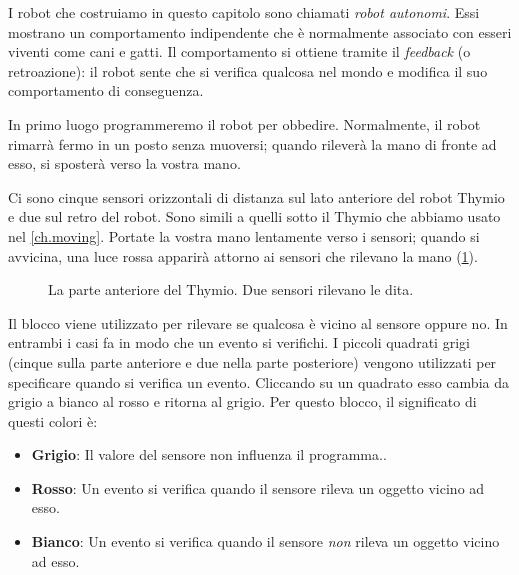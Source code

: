 
\label{ch.pet}

I robot che costruiamo in questo capitolo sono chiamati \emph{robot autonomi}.
Essi mostrano un comportamento indipendente che è normalmente associato con
esseri viventi come cani e gatti. Il comportamento si ottiene tramite il
\textit{feedback} (o retroazione): il robot sente che si verifica qualcosa nel
mondo e modifica il suo comportamento di conseguenza.


In primo luogo programmeremo il robot per obbedire. Normalmente, il robot rimarrà fermo in
un posto senza muoversi; quando rileverà la mano di fronte ad esso,
si sposterà verso la vostra mano.

Ci sono cinque sensori orizzontali di distanza sul lato anteriore del robot Thymio
e due sul retro del robot.
Sono simili a quelli sotto il Thymio che abbiamo usato nel \cref{ch.moving}.
Portate la vostra mano lentamente verso i
sensori; quando si avvicina, una luce rossa apparirà attorno ai sensori
che rilevano la mano (\cref{fig.detect}).

\begin{figure}
\begin{center}
\caption{La parte anteriore del Thymio. Due sensori rilevano le dita.}\label{fig.detect}
\end{center}
\end{figure}

Il blocco  viene utilizzato per rilevare se qualcosa è vicino al
sensore oppure no. In entrambi i casi fa in modo che un evento si verifichi. I piccoli
quadrati grigi (cinque sulla parte anteriore e due nella parte posteriore) vengono utilizzati per specificare
quando si verifica un evento. Cliccando su un quadrato esso cambia da grigio a
bianco al rosso e ritorna al grigio.
Per questo blocco, il significato di questi colori è:

\begin{itemize}[noitemsep, nosep,leftmargin=*]
\item \textbf{Grigio}: Il valore del sensore non influenza il
programma..
\item \textbf{Rosso}: Un evento si verifica quando il sensore rileva un oggetto
vicino ad esso.
\item \textbf{Bianco}: Un evento si verifica quando il sensore \emph{non} rileva un oggetto
vicino ad esso.
\end{itemize}

